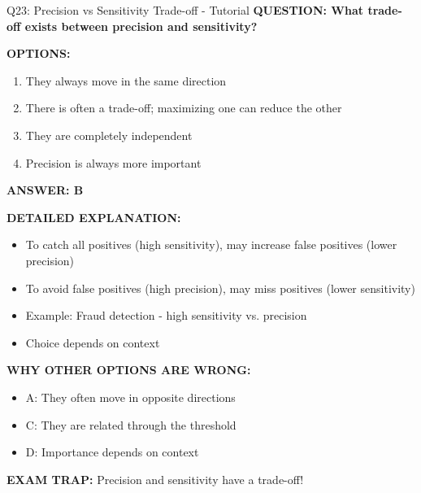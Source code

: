 \documentclass[8pt]{beamer}
\begin{document}
	\begin{frame}{Q23: Precision vs Sensitivity Trade-off - Tutorial}
		\fontsize{6.5}{7.5}\selectfont
		\textbf{QUESTION: What trade-off exists between precision and sensitivity?}
		
		\vspace{0.1cm}
		\textbf{OPTIONS:}
		\begin{enumerate}
			\item They always move in the same direction
			\item There is often a trade-off; maximizing one can reduce the other
			\item They are completely independent
			\item Precision is always more important
		\end{enumerate}
		
		\vspace{0.1cm}
		\textcolor{myblue}{\textbf{ANSWER: B}}
		
		\vspace{0.1cm}
		\textbf{DETAILED EXPLANATION:}
		\begin{itemize}
			\item To catch all positives (high sensitivity), may increase false positives (lower precision)
			\item To avoid false positives (high precision), may miss positives (lower sensitivity)
			\item Example: Fraud detection - high sensitivity vs. precision
			\item Choice depends on context
		\end{itemize}
		
		\vspace{0.1cm}
		\textcolor{myred}{\textbf{WHY OTHER OPTIONS ARE WRONG:}}
		\begin{itemize}
			\item \textcolor{myred}{A:} They often move in opposite directions
			\item \textcolor{myred}{C:} They are related through the threshold
			\item \textcolor{myred}{D:} Importance depends on context
		\end{itemize}
		
		\textcolor{myred}{\textbf{EXAM TRAP:}} Precision and sensitivity have a \textcolor{myblue}{trade-off}!
	\end{frame}
	
\end{document}

